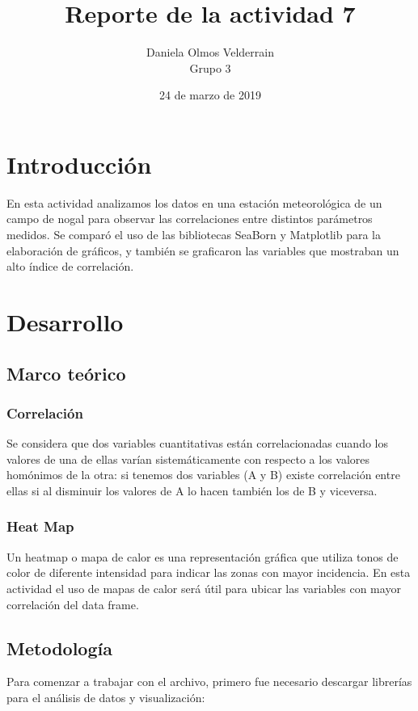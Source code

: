 \documentclass[letterpaper,12pt]{article}
\begin{document}
\title{Reporte de la actividad 7}
\author{Daniela Olmos Velderrain\\Grupo 3}
\date{24 de marzo de 2019}

\maketitle

\section{Introducción}
    En esta actividad analizamos los datos en una estación meteorológica de un campo de nogal para observar las correlaciones entre distintos parámetros medidos. Se comparó el uso de las bibliotecas SeaBorn y Matplotlib para la elaboración de gráficos, y también se graficaron las variables que mostraban un alto índice de correlación. 
    
\section{Desarrollo}
\subsection{Marco teórico}
\subsubsection{Correlación}
Se considera que dos variables cuantitativas están correlacionadas cuando los valores de una de ellas varían sistemáticamente con respecto a los valores homónimos de la otra: si tenemos dos variables (A y B) existe correlación entre ellas si al disminuir los valores de A lo hacen también los de B y viceversa.

\subsubsection{Heat Map}
Un heatmap o mapa de calor es una representación gráfica que utiliza tonos de color de diferente intensidad para indicar las zonas con mayor incidencia. En esta actividad el uso de mapas de calor será útil para ubicar las variables con mayor correlación del data frame.


\subsection{Metodología} 
Para comenzar a trabajar con el archivo, primero fue necesario descargar librerías para el análisis de datos y visualización:
\end{document}

